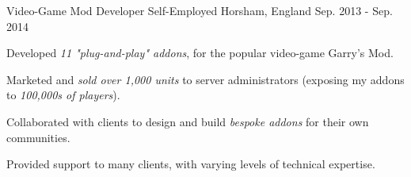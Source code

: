\begin{cventries}
  \cventry
    {Video-Game Mod Developer} %
    {Self-Employed} %
    {Horsham, England} %
    {Sep. 2013 - Sep. 2014} %
    {
      \begin{cvitems} %
        \item Developed \textit{11 "plug-and-play" addons}, for the popular video-game Garry's Mod.
        \item Marketed and \textit{sold over 1,000 units} to server administrators (exposing my addons to \textit{100,000s of players}).
        \item Collaborated with clients to design and build \textit{bespoke addons} for their own communities.
        \item Provided support to many clients, with varying levels of technical expertise.
      \end{cvitems}
    }
    {}
\end{cventries}
